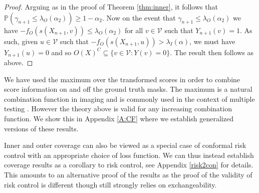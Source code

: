 \begin{proof}
	Arguing as in the proof of Theorem \ref{thm:inner}, it follows that $\mathbb{P}\left(\gamma_{n+1} \leq \lambda_O(\alpha_2) \right) \geq 1 - \alpha_2.$
	Now on the event that $\gamma_{n+1}\leq \lambda_O(\alpha_2)$ we have $ -f_O(s(X_{n+1},v)) \leq \lambda_O(\alpha_2) $ for all $v \in \mathcal{V}$ such that $Y_{n+1}(v) = 1$. As such, given $u \in \mathcal{V}$ such that $ -f_O(s(X_{n+1},u)) > \lambda_I(\alpha) $, we must have $Y_{n+1}(u) = 0$ and so $	O(X)^C  \subseteq \lbrace v\in \mathcal{V}: Y(v) = 0 \rbrace  $. The result then follows as above.
\end{proof}
\begin{remark}\label{rmk:max}
	We have used the maximum over the transformed scores in order to combine score information on and off the ground truth masks. The maximum is a natural combination function in imaging and is commonly used in the context of multiple testing \citep{Worsley1992}. However the theory above is valid for any increasing combination function. We show this in Appendix \ref{A:CF} where we establish generalized versions of these results.
\end{remark}
\begin{remark}
	Inner and outer coverage can also be viewed as a special case of conformal risk control with an appropriate choice of loss function. We can thus instead establish coverage results as a corollary to risk control, see Appendix \ref{risk2con} for details. This amounts to an alternative proof of the results as the proof of the validity of risk control is different though still strongly relies on exchangeability.
\end{remark}



